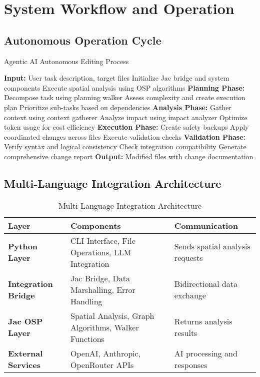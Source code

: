 \documentclass[12pt,a4paper]{article}
\begin{document}
\section{System Workflow and Operation}

\subsection{Autonomous Operation Cycle}

\begin{algorithm}[H]
\caption{Agentic AI Autonomous Editing Process}
\begin{algorithmic}[1]
\STATE \textbf{Input:} User task description, target files
\STATE Initialize Jac bridge and system components
\STATE Execute spatial analysis using OSP algorithms
\STATE \textbf{Planning Phase:}
\STATE \quad Decompose task using planning walker
\STATE \quad Assess complexity and create execution plan
\STATE \quad Prioritize sub-tasks based on dependencies
\STATE \textbf{Analysis Phase:}
\STATE \quad Gather context using context gatherer
\STATE \quad Analyze impact using impact analyzer
\STATE \quad Optimize token usage for cost efficiency
\STATE \textbf{Execution Phase:}
\STATE \quad Create safety backups
\STATE \quad Apply coordinated changes across files
\STATE \quad Execute validation checks
\STATE \textbf{Validation Phase:}
\STATE \quad Verify syntax and logical consistency
\STATE \quad Check integration compatibility
\STATE \quad Generate comprehensive change report
\STATE \textbf{Output:} Modified files with change documentation
\end{algorithmic}
\end{algorithm}

\subsection{Multi-Language Integration Architecture}

\begin{table}[H]
\centering
\caption{Multi-Language Integration Architecture}
\begin{tabularx}{\textwidth}{|l|X|X|}
\hline
\textbf{Layer} & \textbf{Components} & \textbf{Communication} \\
\hline
\textbf{Python Layer} & CLI Interface, File Operations, LLM Integration & Sends spatial analysis requests \\
\hline
\textbf{Integration Bridge} & Jac Bridge, Data Marshalling, Error Handling & Bidirectional data exchange \\
\hline
\textbf{Jac OSP Layer} & Spatial Analysis, Graph Algorithms, Walker Functions & Returns analysis results \\
\hline
\textbf{External Services} & OpenAI, Anthropic, OpenRouter APIs & AI processing and responses \\
\hline
\end{tabularx}
\label{fig:architecture}
\end{table}
\end{document}
